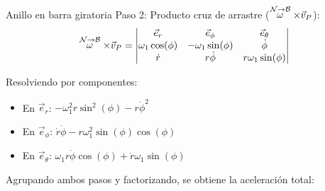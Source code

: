 \begin{solucion}{Anillo en barra giratoria}
Paso 2: Producto cruz de arrastre ($\stackrel{\mathcal{N} \to \mathcal{B}}{\omega}\times\vec{v}_P$):
$$ \stackrel{\mathcal{N} \to \mathcal{B}}{\omega}\times\vec{v}_P = \begin{vmatrix} \vec{e}_r & \vec{e}_\phi & \vec{e}_\theta \\ \omega_1\cos(\phi) & -\omega_1\sin(\phi) & \dot\phi \\ \dot{r} & r\dot\phi & r\omega_1\sin(\phi) \end{vmatrix} $$

Resolviendo por componentes:
\begin{itemize}
    \item En $\vec{e}_r$: $-\omega_1^2 r \sin^2(\phi) - r\dot\phi^2$
    \item En $\vec{e}_\phi$: $\dot{r}\dot\phi - r\omega_1^2\sin(\phi)\cos(\phi)$
    \item En $\vec{e}_\theta$: $\omega_1 r \dot\phi \cos(\phi) + \dot{r}\omega_1\sin(\phi)$
\end{itemize}

Agrupando ambos pasos y factorizando, se obtiene la aceleración total:
\end{solucion}

